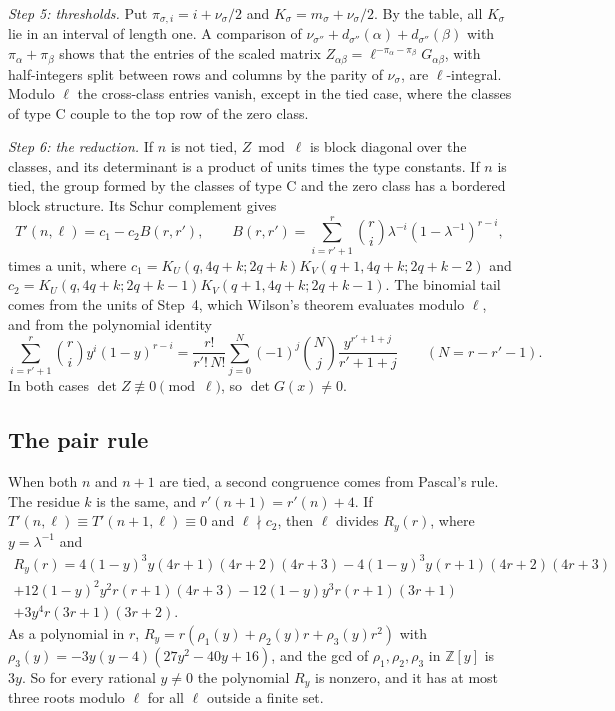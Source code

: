 \documentclass[11pt]{amsart}
\theoremstyle{definition}
\theoremstyle{remark}
\numberwithin{equation}{section}
\newcommand{\Z}{\mathbb Z}
\begin{document}
\emph{Step 5: thresholds.} Put $\pi_{\sigma,i}=i+\nu_\sigma/2$ and $K_\sigma=m_\sigma+\nu_\sigma/2$. By the table,
all $K_\sigma$ lie in an interval of length one. A comparison of
$\nu_{\sigma''}+d_{\sigma''}(\alpha)+d_{\sigma''}(\beta)$ with $\pi_\alpha+\pi_\beta$ shows that the entries of the
scaled matrix $Z_{\alpha\beta}=\ell^{-\pi_\alpha-\pi_\beta}G_{\alpha\beta}$, with half-integers split between rows and
columns by the parity of $\nu_\sigma$, are $\ell$-integral. Modulo $\ell$ the cross-class entries vanish, except in
the tied case, where the classes of type C couple to the top row of the zero class.

\emph{Step 6: the reduction.} If $n$ is not tied, $Z\bmod\ell$ is block diagonal over the classes, and its
determinant is a product of units times the type constants. If $n$ is tied, the group formed by the classes of type C
and the zero class has a bordered block structure. Its Schur complement gives
\begin{equation}\label{eq:Tprime}
 T'(n,\ell)=c_1-c_2B(r,r'),\qquad B(r,r')=\sum_{i=r'+1}^r\binom ri\lambda^{-i}(1-\lambda^{-1})^{r-i},
\end{equation}
times a unit, where $c_1=K_U(q,4q+k;2q+k)K_V(q+1,4q+k;2q+k-2)$ and $c_2=K_U(q,4q+k;2q+k-1)K_V(q+1,4q+k;2q+k-1)$. The
binomial tail comes from the units of Step~4, which Wilson's theorem evaluates modulo $\ell$, and from the polynomial
identity
\[
 \sum_{i=r'+1}^r\binom riy^i(1-y)^{r-i}=\frac{r!}{r'!\,N!}\sum_{j=0}^N(-1)^j\binom Nj\frac{y^{r'+1+j}}{r'+1+j}\qquad(N=r-r'-1).
\]
In both cases $\det Z\not\equiv0\pmod\ell$, so $\det G(x)\ne0$.

\subsection{The pair rule}
When both $n$ and $n+1$ are tied, a second congruence comes from Pascal's rule. The residue $k$ is the same, and
$r'(n+1)=r'(n)+4$. If $T'(n,\ell)\equiv T'(n+1,\ell)\equiv0$ and $\ell\nmid c_2$, then $\ell$ divides
$R_y(r)$, where $y=\lambda^{-1}$ and
\begin{multline*}
 R_y(r)=4(1-y)^3y(4r+1)(4r+2)(4r+3)-4(1-y)^3y(r+1)(4r+2)(4r+3)\\
 +12(1-y)^2y^2r(r+1)(4r+3)-12(1-y)y^3r(r+1)(3r+1)\\
 +3y^4r(3r+1)(3r+2).
\end{multline*}
As a polynomial in $r$, $R_y=r(\rho_1(y)+\rho_2(y)r+\rho_3(y)r^2)$ with
$\rho_3(y)=-3y(y-4)(27y^2-40y+16)$, and the gcd of $\rho_1,\rho_2,\rho_3$ in $\Z[y]$ is $3y$. So for every rational
$y\ne0$ the polynomial $R_y$ is nonzero, and it has at most three roots modulo $\ell$ for all $\ell$ outside a finite
set.
\end{document}
